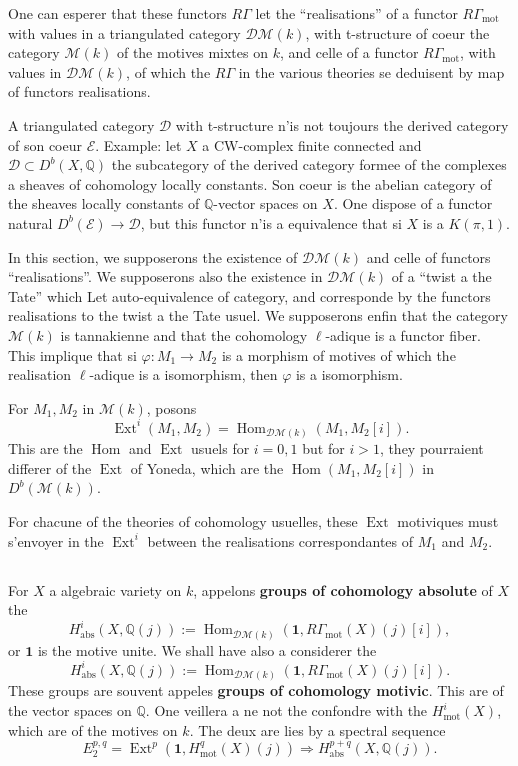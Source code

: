 \documentclass[11pt,a4paper]{article}
\theoremstyle{plain}
\theoremstyle{definition}
\DeclareMathOperator{\Ext}{Ext}
\DeclareMathOperator{\Hom}{Hom}
\newcommand{\Q}{\mathbb{Q}}
\DeclareMathOperator{\mot}{mot}
\newcommand{\abs}{\mathrm{abs}}
\begin{document}
One can esperer that these functors $R\Gamma$ let the ``realisations'' of a functor $R\Gamma_{\mot}$ with values in a triangulated category $\mathscr{D}\mathcal{M}(k)$, with t-structure of coeur the category $\mathcal{M}(k)$ of the motives mixtes on $k$, and celle of a functor $R\Gamma_{\mot}$, with values in $\mathscr{D}\mathcal{M}(k)$, of which the $R\Gamma$ in the various theories se deduisent by map of functors realisations.

A triangulated category $\mathscr{D}$ with t-structure n'is not toujours the derived category of son coeur $\mathcal{E}$. Example: let $X$ a CW-complex finite connected and $\mathscr{D} \subset D^b(X, \Q)$ the subcategory of the derived category formee of the complexes a sheaves of cohomology locally constants. Son coeur is the abelian category of the sheaves locally constants of $\Q$-vector spaces on $X$. One dispose of a functor natural $D^b(\mathcal{E}) \to \mathscr{D}$, but this functor n'is a equivalence that si $X$ is a $K(\pi, 1)$.

In this section, we supposerons the existence of $\mathscr{D}\mathcal{M}(k)$ and celle of functors ``realisations''. We supposerons also the existence in $\mathscr{D}\mathcal{M}(k)$ of a ``twist a the Tate'' which Let auto-equivalence of category, and corresponde by the functors realisations to the twist a the Tate usuel. We supposerons enfin that the category $\mathcal{M}(k)$ is tannakienne and that the cohomology $\ell$-adique is a functor fiber. This implique that si $\varphi: M_1 \to M_2$ is a morphism of motives of which the realisation $\ell$-adique is a isomorphism, then $\varphi$ is a isomorphism.

For $M_1, M_2$ in $\mathcal{M}(k)$, posons
$$
\Ext^i(M_1, M_2) = \Hom_{\mathscr{D}\mathcal{M}(k)}(M_1, M_2[i]).
$$
This are the $\Hom$ and $\Ext$ usuels for $i = 0, 1$ but for $i > 1$, they pourraient differer of the $\Ext$ of Yoneda, which are the $\Hom(M_1, M_2[i])$ in $D^b(\mathcal{M}(k))$.

For chacune of the theories of cohomology usuelles, these $\Ext$ motiviques must s'envoyer in the $\Ext^i$ between the realisations correspondantes of $M_1$ and $M_2$.

\subsection{}

For $X$ a algebraic variety on $k$, appelons \textbf{groups of cohomology absolute} of $X$ the
$$
H^i_{\abs}(X, \Q(j)) := \Hom_{\mathscr{D}\mathcal{M}(k)}(\mathbf{1}, R\Gamma_{\mot}(X)(j)[i]),
$$
or $\mathbf{1}$ is the motive unite. We shall have also a considerer the
$$
H^i_{\abs}(X, \Q(j)) := \Hom_{\mathscr{D}\mathcal{M}(k)}(\mathbf{1}, R\Gamma_{\mot}(X)(j)[i]).
$$
These groups are souvent appeles \textbf{groups of cohomology motivic}. This are of the vector spaces on $\Q$. One veillera a ne not the confondre with the $H^i_{\mot}(X)$, which are of the motives on $k$. The deux are lies by a spectral sequence
\begin{equation}
\tag{3.2.1}
E_2^{p,q} = \Ext^p(\mathbf{1}, H^q_{\mot}(X)(j)) \Rightarrow H^{p+q}_{\abs}(X, \Q(j)).
\end{equation}
\end{document}
